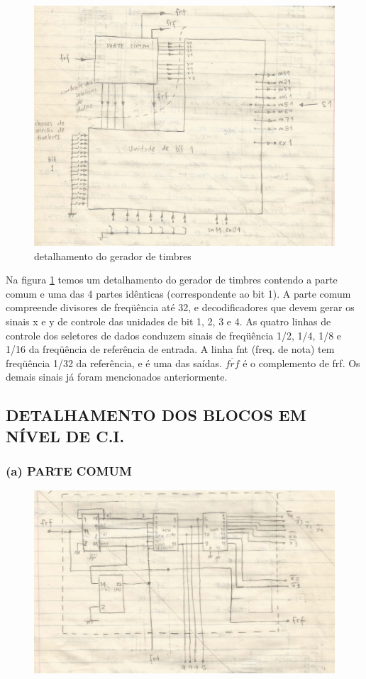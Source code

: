 \documentclass{article}
\begin{document}
\begin{figure}[H]
\label{detalhamento do gerador de timbres}
\centering
\includegraphics[width=12cm]{figuras/2.2.2-detalhamento do gerador de timbres.png}
\caption{detalhamento do gerador de timbres}
\end{figure}

Na figura \ref{detalhamento do gerador de timbres} temos um detalhamento do gerador de timbres contendo a parte comum e uma das 4 partes idênticas (correspondente ao bit 1). A parte comum compreende divisores de freqüência até 32, e decodificadores que devem gerar os sinais x e y de controle das unidades de bit 1, 2, 3 e 4. As quatro linhas de controle dos seletores de dados conduzem sinais de freqüência 1/2, 1/4, 1/8 e 1/16 da freqüência de referência de entrada. A linha fnt (freq. de nota) tem freqüência 1/32 da referência, e é uma das saídas. $\overline{frf}$ é o complemento de frf. Os demais sinais já foram mencionados anteriormente.

\subsection{DETALHAMENTO DOS BLOCOS EM NÍVEL DE C.I.}

\subsubsection{(a) PARTE COMUM}
\begin{figure}[H]
\centering
\includegraphics[width=12cm]{figuras/detalhamento dos blocos em nivel de ci - parte comum.png}
\end{figure}
\end{document}
